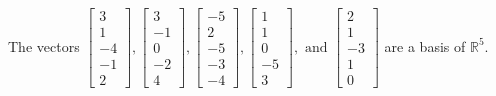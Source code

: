 \begin{exercise}
\begin{exerciseStatement}
  \end{exerciseStatement}
  \begin{exerciseAnswer}
   The vectors \(\left[\begin{array}{r}
3 \\
1 \\
-4 \\
-1 \\
2
\end{array}\right] , \left[\begin{array}{r}
3 \\
-1 \\
0 \\
-2 \\
4
\end{array}\right] , \left[\begin{array}{r}
-5 \\
2 \\
-5 \\
-3 \\
-4
\end{array}\right] , \left[\begin{array}{r}
1 \\
1 \\
0 \\
-5 \\
3
\end{array}\right] , \text{ and } \left[\begin{array}{r}
2 \\
1 \\
-3 \\
1 \\
0
\end{array}\right]\) 
  	 are  a basis of \(\mathbb{R}^5\).
  


  \end{exerciseAnswer}
\end{exercise}